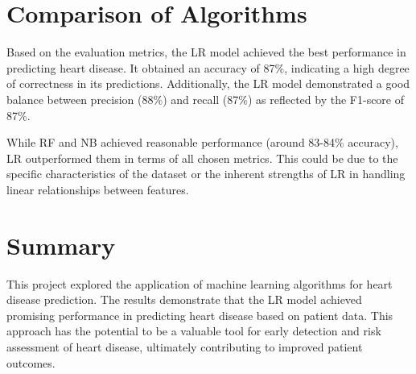 \section{Comparison of Algorithms}
Based  on the evaluation metrics, the LR model achieved the best performance in predicting heart disease. It obtained an accuracy of 87\%, indicating a high degree of correctness in its predictions. Additionally, the LR model demonstrated a good balance between precision (88\%) and recall (87\%) as reflected by the F1-score of 87\%.

While RF and NB achieved reasonable performance (around 83-84\% accuracy), LR outperformed them in terms of all chosen metrics. This could be due to the specific characteristics of the dataset or the inherent strengths of LR in handling linear relationships between features.

\section{Summary}
This project explored the application of machine learning algorithms for heart disease prediction. The results demonstrate that the LR model achieved promising performance in predicting heart disease based on patient data. This approach has the potential to be a valuable tool for early detection and risk assessment of heart disease, ultimately contributing to improved patient outcomes.